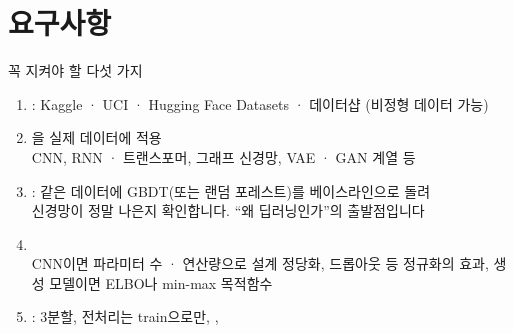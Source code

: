 \documentclass[aspectratio=169,11pt,t]{beamer}
\begin{document}
\section{요구사항}
\begin{frame}{꼭 지켜야 할 다섯 가지}
\vfill
\begin{enumerate}
\setlength\itemsep{0.7em}
\item {}: Kaggle · UCI · Hugging Face Datasets · 데이터샵 (비정형 데이터 가능)
\item {}을 실제 데이터에 적용\\
{\small CNN, RNN · 트랜스포머, 그래프 신경망, VAE · GAN 계열 등}
\item {}: 같은 데이터에 GBDT(또는 랜덤 포레스트)를 베이스라인으로 돌려\\ 신경망이 정말 나은지 확인합니다. ``왜 딥러닝인가''의 출발점입니다
\item {}\\
{\small CNN이면 파라미터 수 · 연산량으로 설계 정당화, 드롭아웃 등 정규화의 효과, 생성 모델이면 ELBO나 min-max 목적함수}
\item {}: 3분할, 전처리는 train으로만, , 
\end{enumerate}
\vfill
{}
\end{frame}
\end{document}
